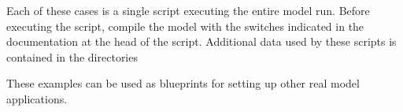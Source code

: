 \noindent 
Each of these cases is a single script executing the entire model run. Before
executing the script, compile the model with the switches indicated in the
documentation at the head of the script. Additional data used by these scripts
is contained in the directories

\begin{flist}
\end{flist}

\noindent 
These examples can be used as blueprints for setting up other real model
applications.


